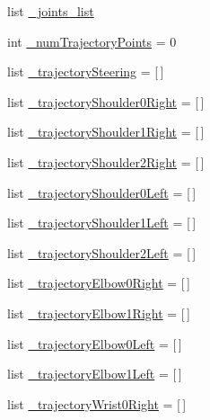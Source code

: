 \begin{DoxyCompactItemize}
\item 
list \mbox{\hyperlink{namespacesteering__simulation_a76a7d611ad7418a972e460503b3f6ad5}{\+\_\+joints\+\_\+list}}
\item 
int \mbox{\hyperlink{namespacesteering__simulation_ab2b60690901db0cb00dcb7a84a575208}{\+\_\+num\+Trajectory\+Points}} = 0
\item 
list \mbox{\hyperlink{namespacesteering__simulation_ad897df89602b12dca6cf1d693cd90948}{\+\_\+trajectory\+Steering}} = \mbox{[}$\,$\mbox{]}
\item 
list \mbox{\hyperlink{namespacesteering__simulation_a8d39f809cc1766c3ac57a804f35d15fb}{\+\_\+trajectory\+Shoulder0\+Right}} = \mbox{[}$\,$\mbox{]}
\item 
list \mbox{\hyperlink{namespacesteering__simulation_a15d8c8b72dff883083c7e5993efd61b3}{\+\_\+trajectory\+Shoulder1\+Right}} = \mbox{[}$\,$\mbox{]}
\item 
list \mbox{\hyperlink{namespacesteering__simulation_a287bcf5cdb0db4a5423e7a275a85d2bb}{\+\_\+trajectory\+Shoulder2\+Right}} = \mbox{[}$\,$\mbox{]}
\item 
list \mbox{\hyperlink{namespacesteering__simulation_a679488f2cc2cdc4fd40d69ef424875a4}{\+\_\+trajectory\+Shoulder0\+Left}} = \mbox{[}$\,$\mbox{]}
\item 
list \mbox{\hyperlink{namespacesteering__simulation_a30de866115acae4df94758efa870918e}{\+\_\+trajectory\+Shoulder1\+Left}} = \mbox{[}$\,$\mbox{]}
\item 
list \mbox{\hyperlink{namespacesteering__simulation_a6e022b068f1ffb14c82a9a6433914fc3}{\+\_\+trajectory\+Shoulder2\+Left}} = \mbox{[}$\,$\mbox{]}
\item 
list \mbox{\hyperlink{namespacesteering__simulation_a34fabb2baf450d02baa482645b1900a9}{\+\_\+trajectory\+Elbow0\+Right}} = \mbox{[}$\,$\mbox{]}
\item 
list \mbox{\hyperlink{namespacesteering__simulation_aa3297ef058f1ff384a123c5fbcc47b9e}{\+\_\+trajectory\+Elbow1\+Right}} = \mbox{[}$\,$\mbox{]}
\item 
list \mbox{\hyperlink{namespacesteering__simulation_a7ac46e89903b8b00bfcea25d5a0a8514}{\+\_\+trajectory\+Elbow0\+Left}} = \mbox{[}$\,$\mbox{]}
\item 
list \mbox{\hyperlink{namespacesteering__simulation_adb1fd212106914e45e4864d5a3950884}{\+\_\+trajectory\+Elbow1\+Left}} = \mbox{[}$\,$\mbox{]}
\item 
list \mbox{\hyperlink{namespacesteering__simulation_afe9e1def4f12d1f011a8e0e6c2051f48}{\+\_\+trajectory\+Wrist0\+Right}} = \mbox{[}$\,$\mbox{]}

\end{DoxyCompactItemize}
